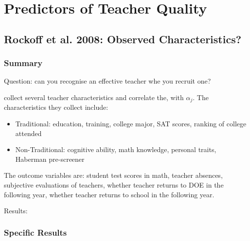 \section{Predictors of Teacher Quality}

    \subsection{Rockoff et al. 2008: Observed Characteristics?}

        \subsubsection{Summary}

            Question: can you recognise an effective teacher whe you recruit one?
    
            \cite{rockoff_can_2011} collect several teacher characteristics and correlate the, with $\alpha_j$. The characteristics they collect include:
            \begin{itemize}
                \item Traditional: education, training, college major, SAT scores, ranking of college attended
                \item Non-Traditional: cognitive ability, math knowledge, personal traits, Haberman pre-screener
            \end{itemize}
            The outcome variables are: student test scores in math, teacher absences, subjective evaluations of teachers, whether teacher returns to DOE in the following year, whether  teacher returns to school in the following year.
    
            Results: 

        \subsubsection{Specific Results}

